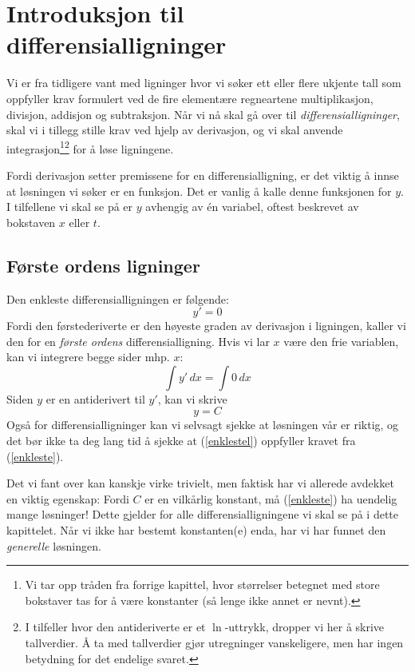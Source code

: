 





\section{Introduksjon til differensialligninger\label{difgen}}
Vi er fra tidligere vant med ligninger hvor vi søker ett eller flere ukjente tall som oppfyller krav formulert ved de fire elementære regneartene multiplikasjon, divisjon, addisjon og subtraksjon. Når vi nå skal gå over til \textit{differensialligninger}, skal vi i tillegg stille krav ved hjelp av derivasjon, og vi skal anvende integrasjon\footnote{Vi tar opp tråden fra forrige kapittel, hvor størrelser betegnet med store bokstaver tas for å være konstanter (så lenge ikke annet er nevnt).}\footnote{I tilfeller hvor den antideriverte er et $\ln $-uttrykk, dropper vi her å skrive tallverdier. Å ta med tallverdier gjør utregninger vanskeligere, men har ingen betydning for det endelige svaret.} for å løse ligningene. \vsk

Fordi derivasjon setter premissene for en differensialligning, er det viktig å innse at løsningen vi søker er en funksjon. Det er vanlig å kalle denne funksjonen for $ y$. I tilfellene vi skal se på er $ y $ avhengig av én variabel, oftest beskrevet av bokstaven $ x $ eller $ t $.

\subsection{Første ordens ligninger}
Den enkleste differensialligningen er følgende:
\begin{equation}
y'=0  \label{enkleste}
\end{equation}
Fordi den førstederiverte er den høyeste graden av derivasjon i ligningen, kaller vi den for en \textit{første ordens} differensialligning. Hvis vi lar $ x $ være den frie variablen, kan vi integrere begge sider mhp. $ x $:
\[ \int y' \,dx = \int 0 \,dx \]
Siden $ y $ er en antiderivert til $ y' $, kan vi skrive
\begin{equation}
y = C \label{enklestel}
\end{equation}
Også for differensialligninger kan vi selvsagt sjekke at løsningen vår er riktig, og det bør ikke ta deg lang tid å sjekke at (\ref{enklestel}) oppfyller kravet fra (\ref{enkleste}).\vsk

Det vi fant over kan kanskje virke trivielt, men faktisk har vi allerede avdekket en viktig egenskap: Fordi $ C $ er en vilkårlig konstant, må (\ref{enkleste}) ha uendelig mange løsninger! Dette gjelder for alle differensialligningene vi skal se på i dette kapittelet. Når vi ikke har bestemt konstanten(e) enda, har vi har funnet den \textit{generelle} løsningen.\vsk

